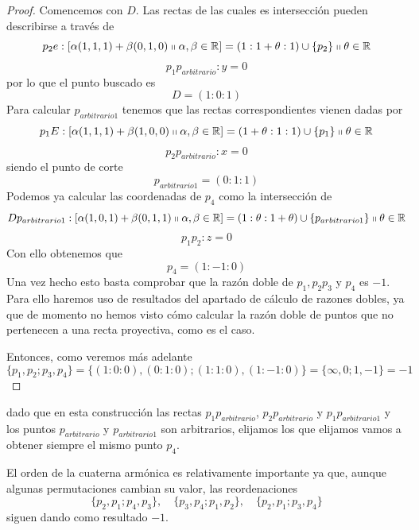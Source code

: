 \begin{proof}
	Comencemos con $D$. Las rectas de las cuales es intersección pueden describirse a través de 
	\begin{equation*}
		p_2e:\left [ \alpha(1,1,1)+\beta(0,1,0)\shortparallel\alpha,\beta\in \mathbb{R} \right ]=(1:1+\theta:1)\cup\{p_2\}\shortparallel\theta\in\mathbb{R}
	\end{equation*}
	\begin{equation*}
		p_1p_{arbitrario}:y=0
	\end{equation*}
	por lo que el punto buscado es
	\[D=(1:0:1)\]
	Para calcular $p_{arbitrario1}$ tenemos que las rectas correspondientes vienen dadas por
	\begin{equation*}
		p_1E:\left [ \alpha(1,1,1)+\beta(1,0,0)\shortparallel\alpha,\beta\in \mathbb{R} \right ]=(1+\theta:1:1)\cup\{p_1\}\shortparallel\theta\in\mathbb{R}
	\end{equation*}
	\begin{equation*}
		p_2p_{arbitrario}:x=0
	\end{equation*}
	siendo el punto de corte
	\[p_{arbitrario1}=(0:1:1)\]
	Podemos ya calcular las coordenadas de $p_4$ como la intersección de 
	\begin{equation*}
		Dp_{arbitrario1}:\left [ \alpha(1,0,1)+\beta(0,1,1)\shortparallel\alpha,\beta\in \mathbb{R} \right ]=(1:\theta:1+\theta)\cup\{p_{arbitrario1}\}\shortparallel\theta\in\mathbb{R}
	\end{equation*}
	\begin{equation*}
		p_1p_2:z=0
	\end{equation*}
	Con ello obtenemos que
	\[p_4=(1:-1:0)\]
	Una vez hecho esto basta comprobar que la razón doble de $p_1,p_2p_3$ y $p_4$ es $-1$. Para ello haremos uso de resultados del apartado de cálculo de razones dobles, ya que de momento no hemos visto cómo calcular la razón doble de puntos que no pertenecen a una recta proyectiva, como es el caso.
	
	Entonces, como veremos más adelante
	\begin{equation}
		\{p_1,p_2;p_3,p_4\}=\{(1:0:0),(0:1:0);(1:1:0),(1:-1:0)\}=\{\infty,0;1,-1\}=-1
	\end{equation}
\end{proof}
dado que en esta construcción las rectas $p_1p_{arbitrario}$, $p_2p_{arbitrario}$ y $p_1p_{arbitrario1}$ y los puntos $p_{arbitrario}$ y $p_{arbitrario1}$ son arbitrarios, elijamos los que elijamos vamos a obtener siempre el mismo punto $p_4$. 

El orden de la cuaterna armónica es relativamente importante ya que, aunque algunas permutaciones cambian su valor, las reordenaciones
\begin{equation*}
	\{p_2,p_1;p_4,p_3\}, \quad \{p_3,p_4;p_1,p_2\}, \quad \{p_2,p_1;p_3,p_4\}
\end{equation*}
siguen dando como resultado $-1$.

